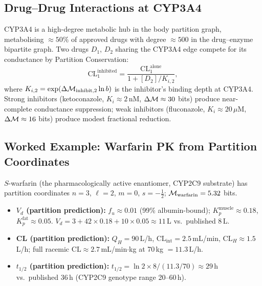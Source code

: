\subsection{Drug--Drug Interactions at CYP3A4}
\label{subsec:ch09-ddi}

CYP3A4 is a high-degree metabolic hub in the body partition graph, metabolising
$\approx 50\%$ of approved drugs with degree $\approx 500$ in the
drug--enzyme bipartite graph.  Two drugs $D_1$, $D_2$ sharing the CYP3A4
edge compete for its conductance by Partition Conservation:
\begin{equation}
  \mathrm{CL}_1^{\mathrm{inhibited}} =
    \frac{\mathrm{CL}_1^{\mathrm{alone}}}{1 + [D_2]/K_{i,2}},
  \label{eq:ch09-DDI}
\end{equation}
where $K_{i,2} = \exp(\Delta\mathcal{M}_{\mathrm{inhibit},2}\ln b)$ is the
inhibitor's binding depth at CYP3A4.  Strong inhibitors (ketoconazole,
$K_i \approx 2$\,nM, $\Delta\mathcal{M} \approx 30$ bits) produce near-complete
conductance suppression; weak inhibitors (fluconazole, $K_i \approx 20\,\mu$M,
$\Delta\mathcal{M} \approx 16$ bits) produce modest fractional reduction.

\subsection{Worked Example: Warfarin PK from Partition Coordinates}
\label{subsec:ch09-warfarin-pk}

$S$-warfarin (the pharmacologically active enantiomer, CYP2C9 substrate)
has partition coordinates $n=3$, $\ell=2$, $m=0$, $s=-\tfrac{1}{2}$;
$\mathcal{M}_{\mathrm{warfarin}} = 5.32$ bits.

\begin{itemize}[leftmargin=2em]
  \item \textbf{$V_d$ (partition prediction):}
    $f_u \approx 0.01$ (99\% albumin-bound);
    $K_p^{\mathrm{muscle}} \approx 0.18$, $K_p^{\mathrm{fat}} \approx 0.05$.
    $V_d = 3 + 42\times0.18 + 10\times0.05 \approx 11$\,L
    vs.\ published 8\,L.
  \item \textbf{CL (partition prediction):}
    $Q_H = 90$\,L/h, $\mathrm{CL}_{\mathrm{int}} = 2.5$\,mL/min,
    $\mathrm{CL}_H \approx 1.5$\,L/h; full racemic $\mathrm{CL} \approx
    2.7$\,mL/min$\cdot$kg at 70\,kg $= 11.3$\,L/h.
  \item \textbf{$t_{1/2}$ (partition prediction):}
    $t_{1/2} = \ln2 \times 8 / (11.3/70) \approx 29$\,h
    vs.\ published 36\,h (CYP2C9 genotype range 20--60\,h).
\end{itemize}

